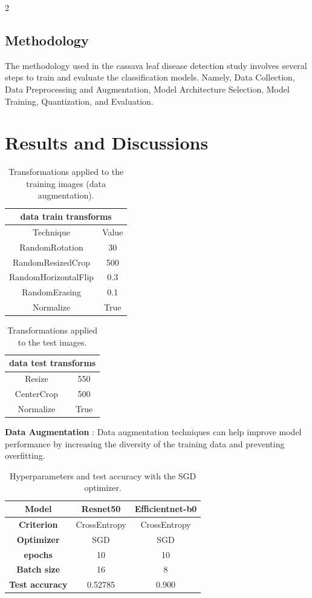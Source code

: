 \documentclass[10pt]{article}
\begin{document}
\begin{multicols*}{2}
\subsection{Methodology}
The methodology used in the cassava leaf disease detection study involves several steps to train and evaluate the classification models. Namely, Data Collection, Data Preprocessing and Augmentation, Model Architecture Selection, Model Training,  Quantization, and Evaluation. 
\section{Results and Discussions}
\begin{table}[H]
\centering
\begin{tabular}{ |c|c| }
 \hline
 \multicolumn{2}{|c|}{\textbf{data train transforms}} \\
\hline
Technique & Value \\
\hline
RandomRotation & 30 \\
\hline
RandomResizedCrop & 500 \\
\hline
RandomHorizontalFlip & 0.3 \\
\hline
RandomErasing & 0.1 \\
\hline
Normalize & True \\
\hline
\end{tabular}
 \caption{Transformations applied to the training images (data augmentation).}
\end{table}

\begin{table}[H]
\centering
\begin{tabular}{ |c|c| }
 \hline
      \multicolumn{2}{|c|}{\textbf{data test transforms}} \\
\hline
       Resize & 550 \\
      \hline
      CenterCrop & 500 \\
      \hline
      Normalize & True \\
      \hline
\end{tabular}
 \caption{Transformations applied to the test images.}
\end{table}
\textbf{Data Augmentation} : Data augmentation techniques can help improve model performance by increasing the diversity of the training data and preventing overfitting.
\newpage

\begin{table}[H]
\centering
\begin{tabular}{ |c|c|c| }
 \hline
\textbf{Model}& Resnet50 & Efficientnet-b0\\
\hline
\textbf{Criterion}  & CrossEntropy& CrossEntropy\\
\hline
\textbf{Optimizer} & SGD & SGD \\
\hline
\textbf{epochs} & 10 & 10 \\
\hline
\textbf{Batch size} &16 & 8 \\
\hline
\textbf{Test accuracy} & 0.52785& 0.900 \\
\hline
\end{tabular}
 \caption{Hyperparameters and test accuracy with the SGD optimizer.}
\end{table}



\end{multicols*}
\end{document}
